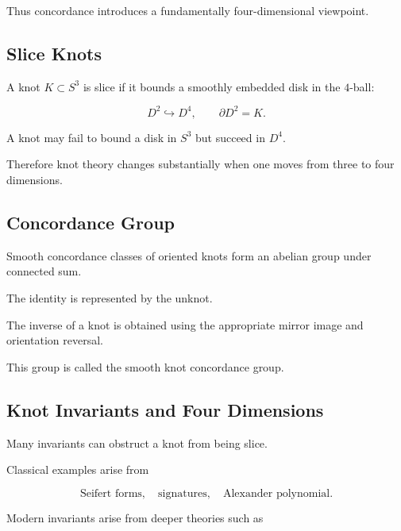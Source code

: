Thus concordance introduces a fundamentally four-dimensional viewpoint.

\subsection{Slice Knots}
\label{subsec:slice-knots}

A knot \(K\subset S^3\) is slice if it bounds a smoothly embedded disk in the
\(4\)-ball:

\[
\boxed{
D^2\hookrightarrow D^4,
\qquad
\partial D^2=K.
}
\]

A knot may fail to bound a disk in \(S^3\) but succeed in \(D^4\).

Therefore knot theory changes substantially when one moves from three to
four dimensions.

\subsection{Concordance Group}
\label{subsec:knot-concordance-group}

Smooth concordance classes of oriented knots form an abelian group under
connected sum.

The identity is represented by the unknot.

The inverse of a knot is obtained using the appropriate mirror image and
orientation reversal.

This group is called the smooth knot concordance group.

\subsection{Knot Invariants and Four Dimensions}
\label{subsec:knot-invariants-four-dimensions}

Many invariants can obstruct a knot from being slice.

Classical examples arise from

\[
\boxed{
\text{Seifert forms},
\quad
\text{signatures},
\quad
\text{Alexander polynomial}.
}
\]

Modern invariants arise from deeper theories such as

